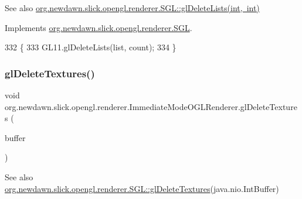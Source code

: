 \begin{DoxySeeAlso}{See also}
\mbox{\hyperlink{interfaceorg_1_1newdawn_1_1slick_1_1opengl_1_1renderer_1_1_s_g_l_a06daf35b442a76f8d6ee62ae413fdd21}{org.\+newdawn.\+slick.\+opengl.\+renderer.\+S\+G\+L\+::gl\+Delete\+Lists(int, int)}} 
\end{DoxySeeAlso}


Implements \mbox{\hyperlink{interfaceorg_1_1newdawn_1_1slick_1_1opengl_1_1renderer_1_1_s_g_l_a06daf35b442a76f8d6ee62ae413fdd21}{org.\+newdawn.\+slick.\+opengl.\+renderer.\+S\+GL}}.


\begin{DoxyCode}
332                                                    \{
333         GL11.glDeleteLists(list, count);
334     \}
\end{DoxyCode}
\mbox{\label{classorg_1_1newdawn_1_1slick_1_1opengl_1_1renderer_1_1_immediate_mode_o_g_l_renderer_a34a5863e766c0b3698ff867c9fa1ab98}} 
\subsubsection{\texorpdfstring{gl\+Delete\+Textures()}{glDeleteTextures()}}
{\footnotesize\ttfamily void org.\+newdawn.\+slick.\+opengl.\+renderer.\+Immediate\+Mode\+O\+G\+L\+Renderer.\+gl\+Delete\+Textures (\begin{DoxyParamCaption}\item[{Int\+Buffer}]{buffer }\end{DoxyParamCaption})\hspace{0.3cm}{\ttfamily [inline]}}

\begin{DoxySeeAlso}{See also}
\mbox{\hyperlink{interfaceorg_1_1newdawn_1_1slick_1_1opengl_1_1renderer_1_1_s_g_l_a763a5728906baa94182a81ed3bb52ca0}{org.\+newdawn.\+slick.\+opengl.\+renderer.\+S\+G\+L\+::gl\+Delete\+Textures}}(java.\+nio.\+Int\+Buffer) 
\end{DoxySeeAlso}


